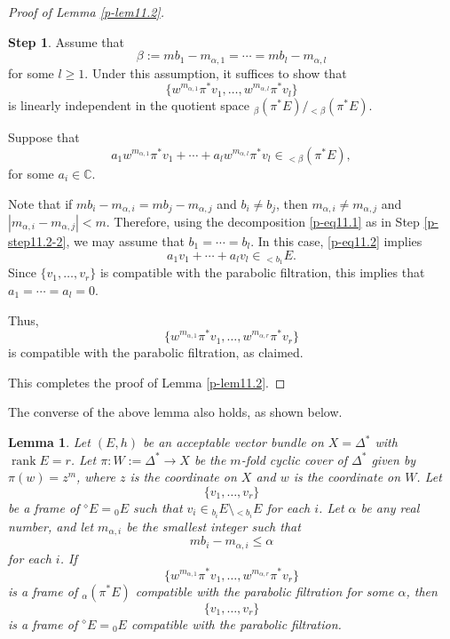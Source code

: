 \documentclass[12pt,twoside]{amsart}
\DeclareMathOperator{\rank}{rank}
\newtheorem{lem}[thm]{Lemma}
\theoremstyle{definition}
\newtheorem{step}{Step}
\begin{document}
\begin{proof}[Proof of Lemma \ref{p-lem11.2}]
\begin{step}
Assume that 
\[
\beta := m b_1 - m_{\alpha,1} = \cdots = m b_l - m_{\alpha,l}
\] 
for some $l \geq 1$. Under this assumption, it suffices to show that 
\[
\{w^{m_{\alpha,1}} \pi^*v_1, \ldots, w^{m_{\alpha,l}} \pi^*v_l\}
\] 
is linearly independent in the quotient 
space ${}_\beta (\pi^*E) / {}_{<\beta}(\pi^*E)$. 

Suppose that 
\begin{equation}\label{p-eq11.2}
a_1 w^{m_{\alpha,1}} \pi^*v_1 + \cdots + 
a_l w^{m_{\alpha,l}} \pi^*v_l \in {}_{<\beta}(\pi^*E),
\end{equation} 
for some $a_i \in \mathbb{C}$. 

Note that if $m b_i - m_{\alpha,i} = m b_j 
- m_{\alpha,j}$ and $b_i \ne b_j$, then $m_{\alpha,i} \ne 
m_{\alpha,j}$ and $|m_{\alpha,i} - m_{\alpha,j}| < m$. 
Therefore, using the 
decomposition \eqref{p-eq11.1} as 
in Step \ref{p-step11.2-2}, we may assume that $b_1 = \cdots = b_l$. 
In this case, \eqref{p-eq11.2} implies 
\[
a_1 v_1 + \cdots + a_l v_l \in {}_{< b_1} E.
\] 
Since $\{v_1, \ldots, v_r\}$ is 
compatible with the parabolic filtration, this implies that $a_1 = \cdots = a_l = 0$. 

Thus, 
\[
\{w^{m_{\alpha,1}} \pi^*v_1, 
\ldots, w^{m_{\alpha,r}} \pi^*v_r\}
\] 
is compatible with the parabolic filtration, as claimed.
\end{step}
This completes the proof of Lemma \ref{p-lem11.2}. 
\end{proof}

The converse of the above lemma also holds, as shown below.

\begin{lem}\label{p-lem11.3}
Let $(E, h)$ be an acceptable vector 
bundle on $X = \Delta^*$ with $\rank E = r$. 
Let $\pi \colon W := \Delta^* \to X$ be 
the $m$-fold cyclic cover of $\Delta^*$ 
given by $\pi(w) = z^m$, where $z$ is the coordinate 
on $X$ and $w$ is the coordinate on $W$. 
Let 
\[
\{v_1, \ldots, v_r\}
\] 
be a frame of ${}^\diamond\! E = {}_0E$ 
such that $v_i \in {}_{b_i}E \setminus {}_{< b_i}E$ for each $i$. 
Let $\alpha$ be any real number, 
and let $m_{\alpha, i}$ be the smallest integer such that 
\[
m b_i - m_{\alpha,i} \leq \alpha
\] 
for each $i$. 
If  
\[
\{w^{m_{\alpha,1}} \pi^*v_1, \ldots, w^{m_{\alpha,r}} \pi^*v_r\}
\] 
is a frame of ${}_\alpha(\pi^*E)$ 
compatible with the parabolic filtration for some $\alpha$, then 
\[
\{v_1, \ldots, v_r\}
\] 
is a frame of ${}^\diamond\!E = {}_0E$ 
compatible with the parabolic filtration. 
\end{lem}
\end{document}
